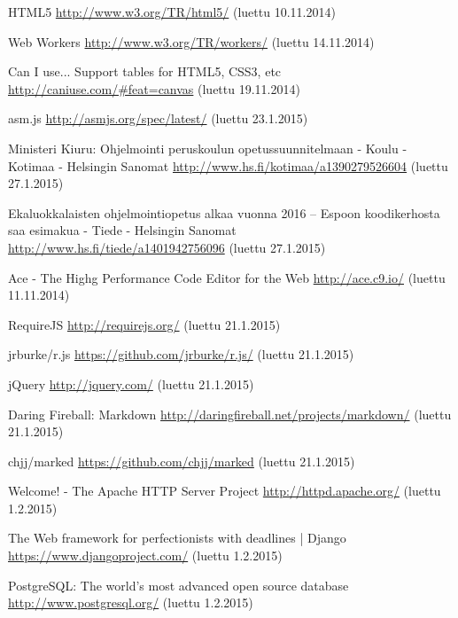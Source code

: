 \begin{thebibliography}{99}
	HTML5 \url{http://www.w3.org/TR/html5/} (luettu 10.11.2014)

	Web Workers \url{http://www.w3.org/TR/workers/} (luettu 14.11.2014)

	Can I use... Support tables for HTML5, CSS3, etc \url{http://caniuse.com/#feat=canvas} (luettu 19.11.2014)

	asm.js \url{http://asmjs.org/spec/latest/} (luettu 23.1.2015)

	Ministeri Kiuru: Ohjelmointi peruskoulun opetussuunnitelmaan - Koulu - Kotimaa - Helsingin Sanomat \url{http://www.hs.fi/kotimaa/a1390279526604} (luettu 27.1.2015)
	
	Ekaluokkalaisten ohjelmointiopetus alkaa vuonna 2016 – Espoon koodikerhosta saa esimakua - Tiede - Helsingin Sanomat \url{http://www.hs.fi/tiede/a1401942756096} (luettu 27.1.2015)

	Ace - The Highg Performance Code Editor for the Web \url{http://ace.c9.io/} (luettu 11.11.2014)

	RequireJS \url{http://requirejs.org/} (luettu 21.1.2015)
	
	jrburke/r.js \url{https://github.com/jrburke/r.js/} (luettu 21.1.2015)
	
	jQuery \url{http://jquery.com/} (luettu 21.1.2015)

	Daring Fireball: Markdown \url{http://daringfireball.net/projects/markdown/} (luettu 21.1.2015)
	
	chjj/marked \url{https://github.com/chjj/marked} (luettu 21.1.2015)
	
	Welcome! - The Apache HTTP Server Project \url{http://httpd.apache.org/} (luettu 1.2.2015)

	The Web framework for perfectionists with deadlines | Django \url{https://www.djangoproject.com/} (luettu 1.2.2015)

	PostgreSQL: The world's most advanced open source database \url{http://www.postgresql.org/} (luettu 1.2.2015)

\end{thebibliography}
